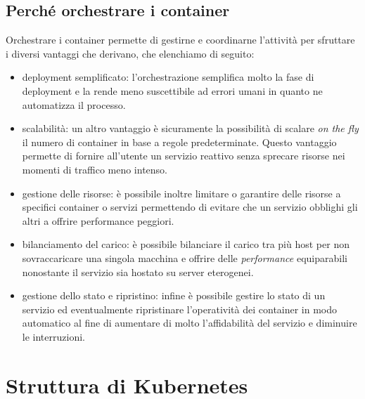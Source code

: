 \documentclass[12pt, hidelinks]{report}
\begin{document}
\subsection{Perché orchestrare i container}
Orchestrare i container permette di gestirne e coordinarne l'attività per sfruttare i diversi vantaggi che derivano, che elenchiamo di seguito:
\begin{itemize}
    \item deployment semplificato: l'orchestrazione semplifica molto la fase di deployment e la rende meno suscettibile ad errori umani in quanto ne automatizza il processo. 
    \item scalabilità: un altro vantaggio è sicuramente la possibilità di scalare \textit{on the fly} il numero di container in base a regole predeterminate. Questo vantaggio permette di fornire all'utente un servizio reattivo senza sprecare risorse nei momenti di traffico meno intenso.
    \item gestione delle risorse: è possibile inoltre limitare o garantire delle risorse a specifici container o servizi permettendo di evitare che un servizio obblighi gli altri a offrire performance peggiori.
    \item bilanciamento del carico: è possibile bilanciare il carico tra più host per non sovraccaricare una singola macchina e offrire delle \textit{performance} equiparabili nonostante il servizio sia hostato su server eterogenei.
    \item gestione dello stato e ripristino: infine è possibile gestire lo stato di un servizio ed eventualmente ripristinare l'operatività dei container in modo automatico al fine di aumentare di molto l'affidabilità del servizio e diminuire le interruzioni.
\end{itemize}

\section{Struttura di Kubernetes}
\end{document}
